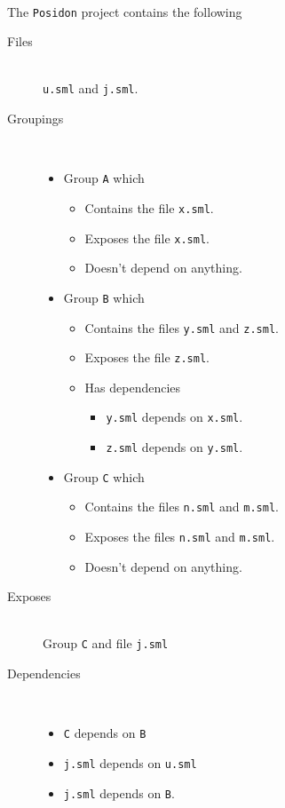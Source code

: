 \begin{example}\ \\
  \label{ex:Sample-project-file-posidon}  
  The \texttt{Posidon} project contains the following 
  
  \begin{description}
  \item[Files]\ \\
    \texttt{u.sml} and \texttt{j.sml}.
    
  \item[Groupings]\
    \begin{itemize}
    \item Group \texttt{A} which
      \begin{itemize}
      \item Contains the file \texttt{x.sml}.
      \item Exposes the file \texttt{x.sml}.
      \item Doesn't depend on anything.
      \end{itemize}
      
    \item Group \texttt{B} which
      \begin{itemize}
      \item Contains the files \texttt{y.sml} and \texttt{z.sml}.
      \item Exposes the file \texttt{z.sml}.
      \item Has dependencies
        \begin{itemize}
        \item \texttt{y.sml} depends on \texttt{x.sml}.
        \item \texttt{z.sml} depends on \texttt{y.sml}.
        \end{itemize}
      \end{itemize}
      
    \item Group \texttt{C} which
      \begin{itemize}
      \item Contains the files \texttt{n.sml} and \texttt{m.sml}.
      \item Exposes the files \texttt{n.sml} and \texttt{m.sml}.
      \item Doesn't depend on anything.
      \end{itemize}
    \end{itemize}


  \item[Exposes]\ \\
    Group \texttt{C} and file \texttt{j.sml}
    
  \item[Dependencies]\
    \begin{itemize}
    \item \texttt{C} depends on \texttt{B}
    \item \texttt{j.sml} depends on \texttt{u.sml}
    \item \texttt{j.sml} depends on \texttt{B}.
    \end{itemize} 
  \end{description}

\end{example}


